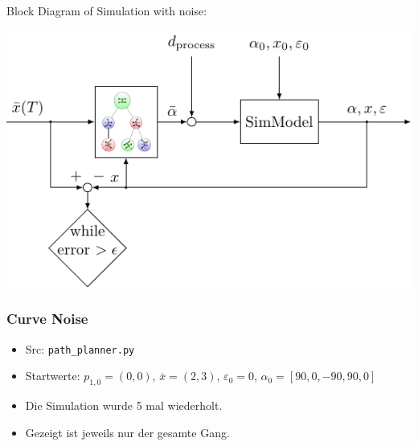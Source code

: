 \documentclass[10pt,a4paper]{article}
\begin{document}
Block Diagram of Simulation with noise:

\includegraphics[scale=1]{pics/CtrLoops/pathplanner_searchtree_noise.pdf}

\subsubsection{Curve Noise}


\begin{itemize}
	\item Src: \texttt{path\_planner.py}
	
	\item Startwerte: $p_{1,0} = (0,0)$, $\bar{x} = (2,3)$, $\varepsilon_0 = 0$, $\alpha_0 = [90,0,-90,90,0]$
	
	\item Die Simulation wurde 5 mal wiederholt.
	
	\item Gezeigt ist jeweils nur der gesamte Gang.

\end{itemize}
\end{document}
